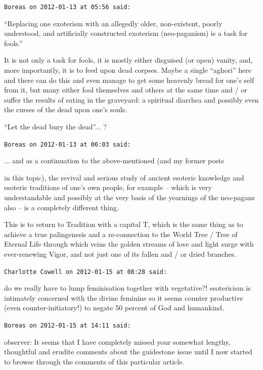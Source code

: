 \begin{footnotesize}
\begin{sffamily}
\texttt{Boreas on 2012-01-13 at 05:56 said:}

``Replacing one exoterism with an allegedly older, non-existent, poorly understood, and artificially constructed exoterism (neo-paganism) is a task for fools.''

It is not only a task for fools, it is mostly either disguised (or open) vanity, and, more importantly, it is to feed upon dead corpses. Maybe a single ``aghori'' here and there can do this and even manage to get some heavenly bread for one's self from it, but many either fool themselves and others at the same time and / or suffer the results of eating in the graveyard: a spiritual diarrhea and possibly even the curses of the dead upon one's souls.

``Let the dead bury the dead''... ?

\hfill

\texttt{Boreas on 2012-01-13 at 06:03 said:}

... and as a continuation to the above-mentioned (and my former posts

in this topic), the revival and serious study of ancient esoteric knowledge and esoteric traditions of one's own people, for example -- which is very understandable and possibly at the very basis of the yearnings of the neo-pagans also -- is a completely different thing.

This is to return to Tradition with a capital T, which is the same thing as to achieve a true palingenesis and a re-connection to the World Tree / Tree of Eternal Life through which veins the golden streams of love and light surge with ever-renewing Vigor, and not just one of its fallen and / or dried branches.

\hfill

\texttt{Charlotte Cowell on 2012-01-15 at 08:28 said:}

do we really have to lump feminisation together with vegetative?! esotericism is intimately concerned with the divine feminine so it seems counter productive (even counter-initiatory!) to negate 50 percent of God and humankind.

\hfill

\texttt{Boreas on 2012-01-15 at 14:11 said:}

observer: It seems that I have completely missed your somewhat lengthy, thoughtful and erudite comments about the guidestone issue until I now started to browse through the comments of this particular article.


\end{sffamily}
\end{footnotesize}

